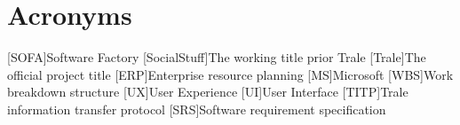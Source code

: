 \chapter{Acronyms}\label{ch:acronyms}
\begin{acronym}
    [SOFA]{Software Factory}
    [SocialStuff]{The working title prior Trale}
    [Trale]{The official project title}
    [ERP]{Enterprise resource planning}
    [MS]{Microsoft}
    [WBS]{Work breakdown structure}
    [UX]{User Experience}
    [UI]{User Interface}
    [TITP]{Trale information transfer protocol}
    [SRS]{Software requirement specification}
\end{acronym}
